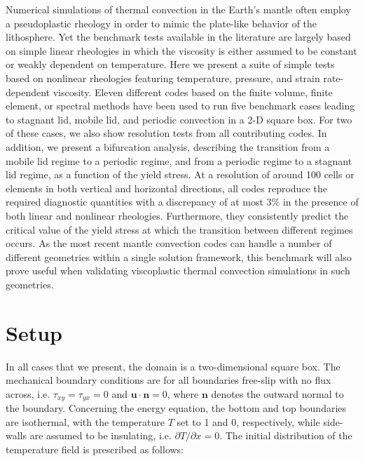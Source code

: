 \begin{displayquote}
{\color{darkgray}
Numerical simulations of thermal convection in the Earth’s mantle often employ a pseudoplastic 
rheology in order to mimic the plate-like behavior of the lithosphere. Yet the benchmark tests available
in the literature are largely based on simple linear rheologies in which the viscosity is either assumed to be
constant or weakly dependent on temperature. Here we present a suite of simple tests based on nonlinear
rheologies featuring temperature, pressure, and strain rate-dependent viscosity. Eleven different codes
based on the finite volume, finite element, or spectral methods have been used to run five benchmark cases
leading to stagnant lid, mobile lid, and periodic convection in a 2-D square box. For two of these cases, we
also show resolution tests from all contributing codes. In addition, we present a bifurcation analysis, describing 
the transition from a mobile lid regime to a periodic regime, and from a periodic regime to a stagnant
lid regime, as a function of the yield stress. At a resolution of around 100 cells or elements in both vertical
and horizontal directions, all codes reproduce the required diagnostic quantities with a discrepancy of at
most 3\% in the presence of both linear and nonlinear rheologies. Furthermore, they consistently predict
the critical value of the yield stress at which the transition between different regimes occurs. As the most
recent mantle convection codes can handle a number of different geometries within a single solution
framework, this benchmark will also prove useful when validating viscoplastic thermal convection 
simulations in such geometries.}
\end{displayquote}

\section*{Setup}

In all cases that we present, the domain is a two-dimensional square box. The mechanical 
boundary conditions are for all boundaries free-slip 
with no flux across, i.e. $\tau_{xy}=\tau_{yx}=0$ and $\boldsymbol{u}\cdot \boldsymbol{n}=0$, 
where $\boldsymbol{n}$ denotes the outward normal to 
the boundary. Concerning the energy equation, the bottom and top boundaries are isothermal, 
with the temperature $T$ set to 1 and 0, respectively, 
while side-walls are assumed to be insulating, i.e. $\partial T/\partial x = 0$. 
The initial distribution of the temperature field is prescribed as follows:

